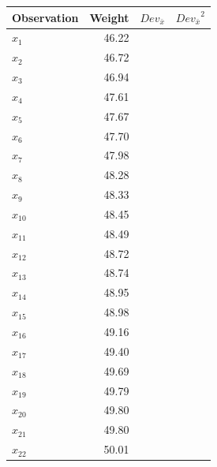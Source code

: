 \documentclass[nohyper,justified]{tufte-handout}\usepackage[]{graphicx}\usepackage[]{color}
\newcommand{\dev}[1] {Dev_{\bar{#1}}}
\begin{document}
\begin{table}[ht]
\centering
\begin{tabular}{lrll}
  \toprule
Observation & Weight & $\dev{x}$ & ${\dev{x}}^2$ \\ 
  \midrule
$x_{1}$ & 46.22 &              &               \\ 
   \rowcolor[gray]{0.95}$x_{2}$ & 46.72 &              &               \\ 
  $x_{3}$ & 46.94 &              &               \\ 
   \rowcolor[gray]{0.95}$x_{4}$ & 47.61 &              &               \\ 
  $x_{5}$ & 47.67 &              &               \\ 
   \rowcolor[gray]{0.95}$x_{6}$ & 47.70 &              &               \\ 
  $x_{7}$ & 47.98 &              &               \\ 
   \rowcolor[gray]{0.95}$x_{8}$ & 48.28 &              &               \\ 
  $x_{9}$ & 48.33 &              &               \\ 
   \rowcolor[gray]{0.95}$x_{10}$ & 48.45 &              &               \\ 
  $x_{11}$ & 48.49 &              &               \\ 
   \rowcolor[gray]{0.95}$x_{12}$ & 48.72 &              &               \\ 
  $x_{13}$ & 48.74 &              &               \\ 
   \rowcolor[gray]{0.95}$x_{14}$ & 48.95 &              &               \\ 
  $x_{15}$ & 48.98 &              &               \\ 
   \rowcolor[gray]{0.95}$x_{16}$ & 49.16 &              &               \\ 
  $x_{17}$ & 49.40 &              &               \\ 
   \rowcolor[gray]{0.95}$x_{18}$ & 49.69 &              &               \\ 
  $x_{19}$ & 49.79 &              &               \\ 
   \rowcolor[gray]{0.95}$x_{20}$ & 49.80 &              &               \\ 
  $x_{21}$ & 49.80 &              &               \\ 
   \rowcolor[gray]{0.95}$x_{22}$ & 50.01 &              &               \\ 

\end{tabular}
\end{table}
\end{document}
